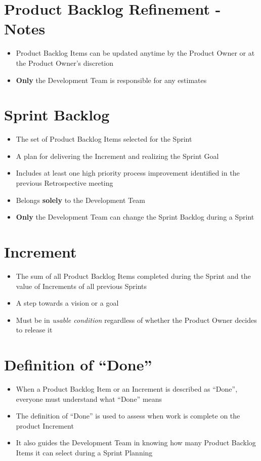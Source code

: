 \documentclass[a4paper,11pt,twocolumn]{article}
\begin{document}
\section*{Product Backlog Refinement - Notes}
\begin{itemize}
	\item Product Backlog Items can be updated anytime by the Product Owner or at the Product Owner's discretion
	\item \textbf{Only} the Development Team is responsible for any estimates
\end{itemize}

\section*{Sprint Backlog}
\begin{itemize}
	\item The set of Product Backlog Items selected for the Sprint
	\item A plan for delivering the Increment and realizing the Sprint Goal
	\item Includes at least one high priority process improvement identified in the previous Retrospective meeting
	\item Belongs \textbf{solely} to the Development Team
	\item \textbf{Only} the Development Team can change the Sprint Backlog during a Sprint
\end{itemize}

\section*{Increment}
\begin{itemize}
	\item The sum of all Product Backlog Items completed during the Sprint and the value of Increments of all previous Sprints
	\item A step towards a vision or a goal
	\item Must be in \textit{usable condition} regardless of whether the Product Owner decides to release it
\end{itemize}

\section*{Definition of ``Done''}
\begin{itemize}
	\item When a Product Backlog Item or an Increment is described as ``Done'', everyone must understand what ``Done'' means
	\item The definition of ``Done'' is used to assess when work is complete on the product Increment
    \item It also guides the Development Team in knowing how many Product Backlog Items it can select during a Sprint Planning
\end{itemize}
\end{document}
